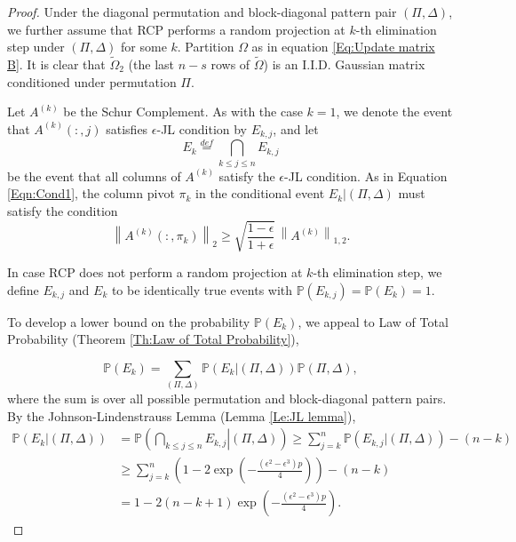 \documentclass[11pt]{article}
\begin{document}
\begin{proof}
Under the diagonal permutation and block-diagonal pattern pair $\left(\Pi, \Delta\right)$, we further assume that RCP performs a random projection at $k$-th elimination step under $\left(\Pi, \Delta\right)$ for some $k$. Partition $\Omega$ as in equation \eqref{Eq:Update matrix B}. It is clear that $\widetilde{\Omega}_2$ (the last $n-s$ rows of $\widetilde{\Omega}$) is an I.I.D. Gaussian matrix conditioned under permutation $\Pi$. 

Let $A^{(k)}$ be the Schur Complement. As with the case $k = 1$, we denote the event that $A^{(k)}( : , j)$ satisfies $\epsilon$-JL condition by $E_{k, j}$, and let 
\begin{equation}\label{Eqn:Ek}
 E_k \stackrel{def}{=} \bigcap_{k \le j \le n} E_{k, j}
\end{equation}
be the event that all columns of $A^{(k)}$ satisfy the $\epsilon$-JL condition. As in Equation \eqref{Eqn:Cond1}, the column pivot $\pi_k$ in the conditional event $E_k  \left| \right. \left(\Pi, \Delta\right) $ must satisfy the condition
\begin{equation}\label{Eqn:Condk}
 \left\| A^{(k)}( : , \pi_k) \right\|_2  \ge \sqrt{ \frac{1 - \epsilon}{1 + \epsilon} } \,  \left\| A^{(k)} \right\|_{1,2}.
\end{equation}

In case RCP does not perform a random projection at $k$-th elimination step, we define $E_{k, j}$ and $E_k$ to be identically true events with $\mathbb{P}\left(E_{k, j}\right) = \mathbb{P}\left(E_{k}\right) = 1$.  

To develop a lower bound on the probability $\mathbb{P} (E_k)$, we appeal to Law of Total Probability (Theorem \ref{Th:Law of Total Probability}), 

$$
\mathbb{P} (E_k) = \sum_{\left(\Pi, \Delta\right)} \mathbb{P} \left( E_k \left| \right. \left(\Pi, \Delta\right) \right) \mathbb{P} \left(\Pi, \Delta\right), 
$$
where the sum is over all possible permutation and block-diagonal pattern pairs. By the Johnson-Lindenstrauss Lemma (Lemma \ref{Le:JL lemma}),  
\begin{align*}
\mathbb{P} \left( E_k \left| \right. \left(\Pi, \Delta\right) \right) & = \mathbb{P} \left( \bigcap_{k \le j \le n} E_{k, j} \left| \right. \left(\Pi, \Delta\right) \right)  \ge \sum_{j = k}^n \mathbb{P}\left(E_{k,j} | \left(\Pi, \Delta\right) \right) - (n - k) \\
& \ge \sum_{j = k}^n \left(1 - 2 \exp \left( - \frac{ (\epsilon^2 - \epsilon^3) p }{4} \right)\right) - (n - k) \\
& = 1- 2(n - k + 1) \exp \left( - \frac{ (\epsilon^2 - \epsilon^3) p }{4} \right).
\end{align*}


\end{proof}
\end{document}
